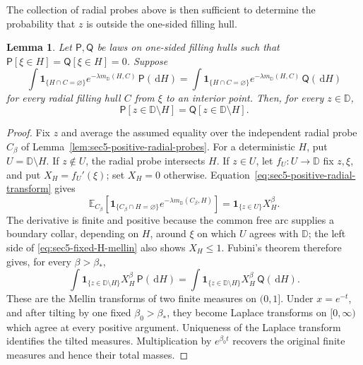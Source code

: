 \documentclass[11pt]{article}
\numberwithin{equation}{section}
\newcommand{\D}{\mathbb{D}}
\newcommand{\E}{\mathbb{E}}
\newcommand{\1}{\mathbf{1}}
\newtheorem{lemma}[theorem]{Lemma}
\newcommand{\one}{\mathbf 1}
\newcommand{\dd}{\,\mathrm d}
\begin{document}
The collection of radial probes above is then sufficient to determine the probability that $z$ is outside the one-sided filling hull.
\begin{lemma}
\label{lem:sec5-mellin}
Let \(\mathsf P,\mathsf Q\) be laws on one-sided filling hulls such that
\(\mathsf P[\xi\in H]=\mathsf Q[\xi\in H]=0\).  Suppose
\[
 \int\one_{\{H\cap C=\varnothing\}}e^{-\lambda m_\D(H,C)}
 \,\mathsf P(\dd H)
 =\int\one_{\{H\cap C=\varnothing\}}e^{-\lambda m_\D(H,C)}
 \,\mathsf Q(\dd H)
\]
for every radial filling hull \(C\) from \(\xi\) to an interior point.
Then, for every \(z\in\D\),
\[
 \mathsf P[z\in\D\setminus H]
 =\mathsf Q[z\in\D\setminus H].
\]
\end{lemma}

\begin{proof}
Fix \(z\) and average the assumed equality over the independent radial probe
\(C_\beta\) of Lemma~\ref{lem:sec5-positive-radial-probes}.  For a deterministic
\(H\), put \(U=\D\setminus H\).  If \(z\notin U\), the radial probe intersects
\(H\).  If \(z\in U\), let \(f_U:U\to\D\) fix \(z,\xi\), and put
\(X_H=f_U'(\xi)\); set \(X_H=0\) otherwise.
Equation~\eqref{eq:sec5-positive-radial-transform} gives
\begin{equation}\label{eq:sec5-fixed-H-mellin}
 \E_{C_\beta}\!\left[
 \one_{\{C_\beta\cap H=\varnothing\}}
 e^{-\lambda m_\D(C_\beta,H)}\right]
 =\one_{\{z\in U\}}X_H^\beta.
\end{equation}
The derivative is finite and positive because the common free arc supplies
a boundary collar, depending on \(H\), around \(\xi\) on which \(U\)
agrees with \(\D\);
the left side of \eqref{eq:sec5-fixed-H-mellin} also shows \(X_H\leq1\).
Fubini's theorem therefore gives, for every \(\beta>\beta_*\),
\[
 \int\one_{\{z\in\D\setminus H\}}X_H^\beta\,\mathsf P(\dd H)
 =
 \int\one_{\{z\in\D\setminus H\}}X_H^\beta\,\mathsf Q(\dd H).
\]
These are the Mellin transforms of two finite measures on \((0,1]\).
Under \(x=e^{-t}\), and after tilting by one fixed
\(\beta_0>\beta_*\), they become Laplace transforms on \([0,\infty)\)
which agree at every positive argument.  Uniqueness of the Laplace
transform identifies the tilted measures.  Multiplication by
\(e^{\beta_0t}\) recovers the original finite measures and hence their
total masses.
\end{proof}
\end{document}
